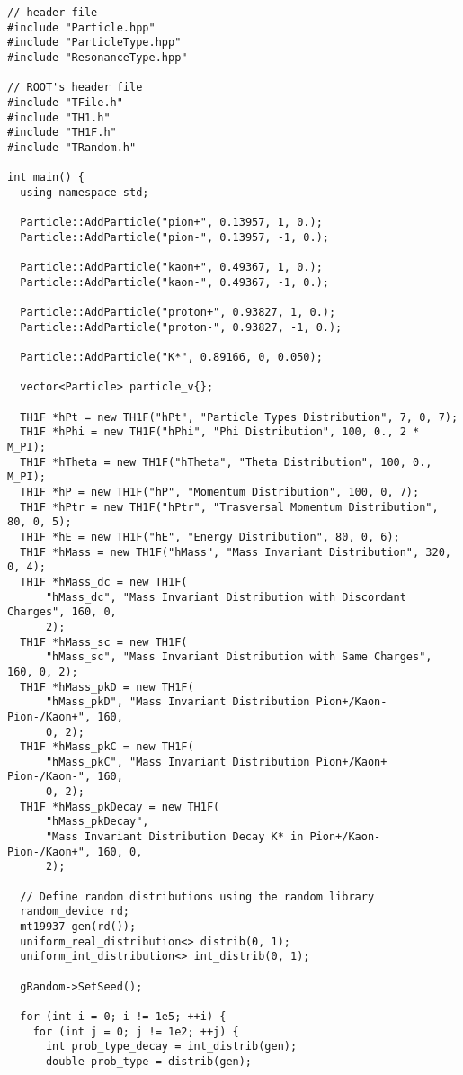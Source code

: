 \begin{lstlisting}
// header file
#include "Particle.hpp"
#include "ParticleType.hpp"
#include "ResonanceType.hpp"

// ROOT's header file
#include "TFile.h"
#include "TH1.h"
#include "TH1F.h"
#include "TRandom.h"

int main() {
  using namespace std;

  Particle::AddParticle("pion+", 0.13957, 1, 0.);
  Particle::AddParticle("pion-", 0.13957, -1, 0.);

  Particle::AddParticle("kaon+", 0.49367, 1, 0.);
  Particle::AddParticle("kaon-", 0.49367, -1, 0.);

  Particle::AddParticle("proton+", 0.93827, 1, 0.);
  Particle::AddParticle("proton-", 0.93827, -1, 0.);

  Particle::AddParticle("K*", 0.89166, 0, 0.050);

  vector<Particle> particle_v{};

  TH1F *hPt = new TH1F("hPt", "Particle Types Distribution", 7, 0, 7);
  TH1F *hPhi = new TH1F("hPhi", "Phi Distribution", 100, 0., 2 * M_PI);
  TH1F *hTheta = new TH1F("hTheta", "Theta Distribution", 100, 0., M_PI);
  TH1F *hP = new TH1F("hP", "Momentum Distribution", 100, 0, 7);
  TH1F *hPtr = new TH1F("hPtr", "Trasversal Momentum Distribution", 80, 0, 5);
  TH1F *hE = new TH1F("hE", "Energy Distribution", 80, 0, 6);
  TH1F *hMass = new TH1F("hMass", "Mass Invariant Distribution", 320, 0, 4);
  TH1F *hMass_dc = new TH1F(
      "hMass_dc", "Mass Invariant Distribution with Discordant Charges", 160, 0,
      2);
  TH1F *hMass_sc = new TH1F(
      "hMass_sc", "Mass Invariant Distribution with Same Charges", 160, 0, 2);
  TH1F *hMass_pkD = new TH1F(
      "hMass_pkD", "Mass Invariant Distribution Pion+/Kaon- Pion-/Kaon+", 160,
      0, 2);
  TH1F *hMass_pkC = new TH1F(
      "hMass_pkC", "Mass Invariant Distribution Pion+/Kaon+ Pion-/Kaon-", 160,
      0, 2);
  TH1F *hMass_pkDecay = new TH1F(
      "hMass_pkDecay",
      "Mass Invariant Distribution Decay K* in Pion+/Kaon- Pion-/Kaon+", 160, 0,
      2);

  // Define random distributions using the random library
  random_device rd;
  mt19937 gen(rd());
  uniform_real_distribution<> distrib(0, 1);
  uniform_int_distribution<> int_distrib(0, 1);

  gRandom->SetSeed();

  for (int i = 0; i != 1e5; ++i) {
    for (int j = 0; j != 1e2; ++j) {
      int prob_type_decay = int_distrib(gen);
      double prob_type = distrib(gen);


\end{lstlisting}
